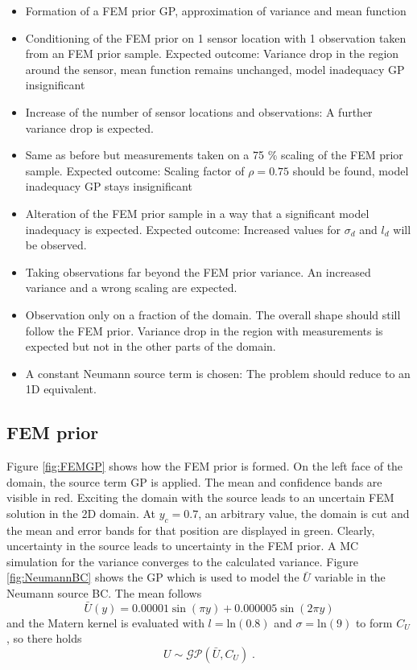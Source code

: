 \documentclass[%
  a4paper,oneside,%
  11pt,%
  smallchapters,
  style=printdev,
  extramargin,
  green,%
  rgb, <cmyk>
  ]{tubsbook}
\begin{document}
\begin{itemize}
  \item Formation of a FEM prior GP, approximation of variance and mean function
  \item Conditioning of the FEM prior on 1 sensor location with 1 observation taken from an FEM prior sample. Expected outcome: Variance drop in the region around the sensor, mean function remains unchanged, model inadequacy GP insignificant
  \item Increase of the number of sensor locations and observations: A further variance drop is expected.
  \item Same as before but measurements taken on a 75 \% scaling of the FEM prior sample. Expected outcome: Scaling factor of $\rho = 0.75$ should be found, model inadequacy GP stays insignificant
  \item Alteration of the FEM prior sample in a way that a significant model inadequacy is expected. Expected outcome: Increased values for $\sigma_d$ and $l_d$ will be observed.
  \item Taking observations far beyond the FEM prior variance. An increased variance and a wrong scaling are expected.
  \item Observation only on a fraction of the domain. The overall shape should still follow the FEM prior. Variance drop in the region with measurements is expected but not in the other parts of the domain.
  \item A constant Neumann source term is chosen: The problem should reduce to an 1D equivalent.

\end{itemize}






\subsection{FEM prior}
Figure \ref{fig:FEMGP} shows how the FEM prior is formed. On the left face of the domain, the source term GP is applied. The mean and confidence bands are visible in red. Exciting the domain with the source leads to an uncertain FEM solution in the 2D domain. At $y_c = 0.7$, an arbitrary value, the domain is cut and the mean and error bands for that position are displayed in green. Clearly, uncertainty in the source leads to uncertainty in the FEM prior. A MC simulation for the variance converges to the calculated variance.
Figure \ref{fig:NeumannBC} shows the GP which is used to model the $\bar{U}$ variable in the Neumann source BC. The mean follows
\begin{equation}
\bar{U}(y) = 0.00001 \sin(\pi y) + 0.000005 \sin(2\pi y)
\end{equation}
and the Matern kernel is evaluated with $l = \mathrm{ln}(0.8)$ and $\sigma = \mathrm{ln}(9)$ to form $C_U$, so there holds
\begin{equation}
U \sim \mathcal{GP}(\bar{U},C_U) \;.
\end{equation}
\end{document}
